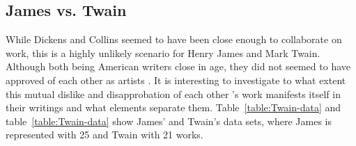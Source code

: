 \documentclass[a4paper,10pt,twoside,fleqn]{article}
\begin{document}
\subsection{James vs. Twain}
While Dickens and Collins seemed to have been close enough to collaborate on work,
this is a highly unlikely scenario for Henry James and Mark Twain. 
Although both being American writers close in age, they did not seemed to have
approved of each other as artists \cite{canby1951turn}. 
It is interesting to investigate to what extent this mutual dislike and 
disapprobation of each other 's work manifests itself in their writings
and what elements separate them. 
Table~\ref{table:Twain-data} and table~\ref{table:Twain-data} show 
James' and Twain's data sets, where James is represented with 25 and Twain
with 21 works. 


\end{document}

